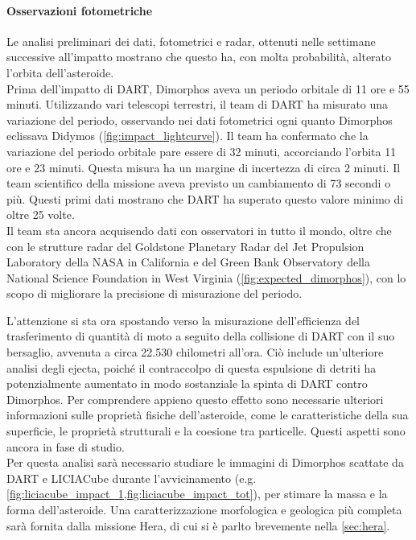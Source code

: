 \documentclass[a4paper,11pt,openright]{book}
\begin{document}
\paragraph*{Osservazioni fotometriche}
Le analisi preliminari dei dati, fotometrici e radar, ottenuti nelle settimane successive all'impatto mostrano che questo ha, con molta probabilità, alterato l'orbita dell'asteroide.\\
Prima dell'impatto di DART, Dimorphos aveva un periodo orbitale di 11 ore e 55 minuti. Utilizzando vari telescopi terrestri, il team di DART ha misurato una variazione del periodo, osservando nei dati fotometrici ogni quanto Dimorphos eclissava Didymos (\cref{fig:impact_lightcurve}). Il team ha confermato che la variazione del periodo orbitale pare essere di 32 minuti, accorciando l'orbita 11 ore e 23 minuti. Questa misura ha un margine di incertezza di circa 2 minuti. 
Il team scientifico della missione aveva previsto un cambiamento di 73 secondi o più. Questi primi dati mostrano che DART ha superato questo valore minimo di oltre 25 volte. \\

Il team sta ancora acquisendo dati con osservatori in tutto il mondo, oltre che con le strutture radar del Goldstone Planetary Radar del Jet Propulsion Laboratory della NASA in California e del Green Bank Observatory della National Science Foundation in West Virginia (\cref{fig:expected_dimorphos}), con lo scopo di migliorare la precisione di misurazione del periodo.

L'attenzione si sta ora spostando verso la misurazione dell'efficienza del trasferimento di quantità di moto a seguito della collisione di DART con il suo bersaglio, avvenuta a circa 22.530 chilometri all'ora. Ciò include un'ulteriore analisi degli ejecta, poiché il contraccolpo di questa espulsione di detriti ha potenzialmente aumentato in modo sostanziale la spinta di DART contro Dimorphos. %
Per comprendere appieno questo effetto sono necessarie ulteriori informazioni sulle proprietà fisiche dell'asteroide, come le caratteristiche della sua superficie, le proprietà strutturali e la coesione tra particelle. Questi aspetti sono ancora in fase di studio.\\
Per questa analisi sarà necessario studiare le immagini di Dimorphos scattate da DART e LICIACube durante l'avvicinamento (e.g. \cref{fig:liciacube_impact_1,fig:liciacube_impact_tot}), per stimare la massa e la forma dell'asteroide. Una caratterizzazione morfologica e geologica più completa sarà fornita dalla missione Hera, di cui si è parlto brevemente nella \cref{sec:hera}.
\end{document}
